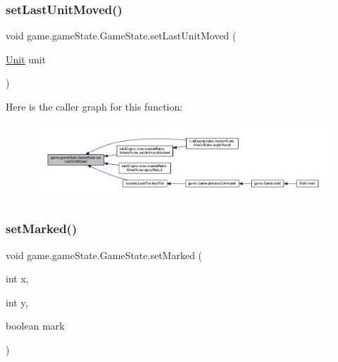 \subsubsection{\texorpdfstring{set\+Last\+Unit\+Moved()}{setLastUnitMoved()}}
{\footnotesize\ttfamily void game.\+game\+State.\+Game\+State.\+set\+Last\+Unit\+Moved (\begin{DoxyParamCaption}\item[{\mbox{\hyperlink{classgame_1_1board_1_1_unit}{Unit}}}]{unit }\end{DoxyParamCaption})\hspace{0.3cm}{\ttfamily [inline]}}

Here is the caller graph for this function\+:
\nopagebreak
\begin{figure}[H]
\begin{center}
\leavevmode
\includegraphics[width=350pt]{classgame_1_1game_state_1_1_game_state_a6b65e481b29441ea54040f36144b1d8b_icgraph}
\end{center}
\end{figure}
\mbox{\label{classgame_1_1game_state_1_1_game_state_a2b96db554e56b41714d9ff4cffed5fbc}} 
\subsubsection{\texorpdfstring{set\+Marked()}{setMarked()}}
{\footnotesize\ttfamily void game.\+game\+State.\+Game\+State.\+set\+Marked (\begin{DoxyParamCaption}\item[{int}]{x,  }\item[{int}]{y,  }\item[{boolean}]{mark }\end{DoxyParamCaption})\hspace{0.3cm}{\ttfamily [inline]}}

